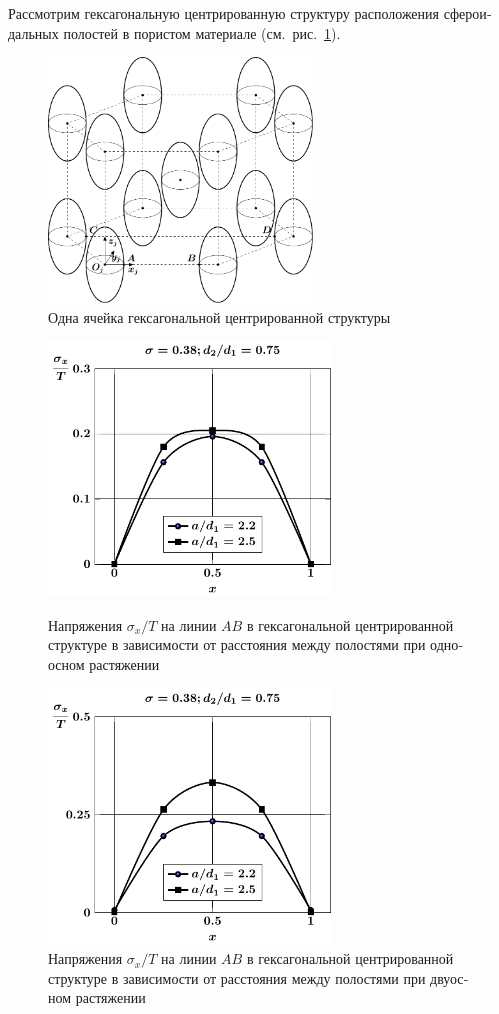 \begin{russian}
Рассмотрим гексагональную центрированную структуру расположения сфероидальных полостей в пористом материале (см.~рис.~\ref{f:9:43}).

\begin{figure}[h!]
\centering
\includegraphics[width=7cm]{cav-13.pdf}
\caption{Одна ячейка гексагональной центрированной структуры}
\label{f:9:43}
\end{figure}

\begin{figure}[h!]
\centering\footnotesize
\parbox[b]{7.5cm}{\centering\includegraphics[width=7.5cm]{cav13-a-d75-t1-sig_x.pdf}
\caption{Напряжения $\sigma_x/T$ на линии $AB$ в гексагональной центрированной структуре в зависимости от расстояния между полостями при одноосном растяжении 
\label{f:9:44}}}\hfil\hfil
\parbox[b]{7.5cm}{\centering\includegraphics[width=7.5cm]{cav13-a-d75-t2-sig_x.pdf}
\caption{Напряжения $\sigma_x/T$ на линии $AB$ в гексагональной центрированной структуре в зависимости от расстояния между полостями при двуосном растяжении
\label{f:9:45}}}
\end{figure}


\end{russian}
